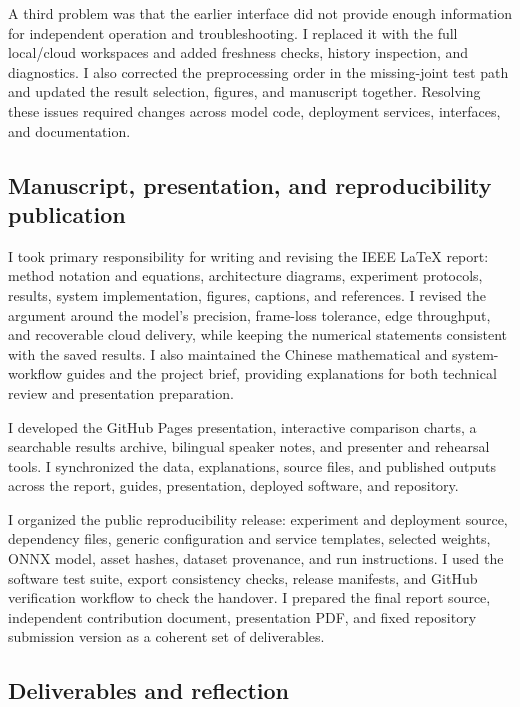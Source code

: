 \documentclass[conference,a4paper]{IEEEtran}
\begin{document}
A third problem was that the earlier interface did not provide enough information for independent operation and troubleshooting. I replaced it with the full local/cloud workspaces and added freshness checks, history inspection, and diagnostics. I also corrected the preprocessing order in the missing-joint test path and updated the result selection, figures, and manuscript together. Resolving these issues required changes across model code, deployment services, interfaces, and documentation.

\newpage
\subsection{Manuscript, presentation, and reproducibility publication}

I took primary responsibility for writing and revising the IEEE LaTeX report: method notation and equations, architecture diagrams, experiment protocols, results, system implementation, figures, captions, and references. I revised the argument around the model's precision, frame-loss tolerance, edge throughput, and recoverable cloud delivery, while keeping the numerical statements consistent with the saved results. I also maintained the Chinese mathematical and system-workflow guides and the project brief, providing explanations for both technical review and presentation preparation.

I developed the GitHub Pages presentation, interactive comparison charts, a searchable results archive, bilingual speaker notes, and presenter and rehearsal tools. I synchronized the data, explanations, source files, and published outputs across the report, guides, presentation, deployed software, and repository.

I organized the public reproducibility release: experiment and deployment source, dependency files, generic configuration and service templates, selected weights, ONNX model, asset hashes, dataset provenance, and run instructions. I used the software test suite, export consistency checks, release manifests, and GitHub verification workflow to check the handover. I prepared the final report source, independent contribution document, presentation PDF, and fixed repository submission version as a coherent set of deliverables.

\subsection{Deliverables and reflection}
\end{document}
